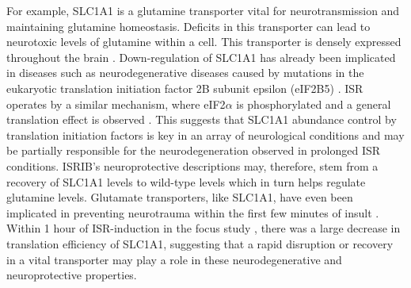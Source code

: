 \documentclass[11pt, a4paper, oneside]{article}
\begin{document}
For example, SLC1A1 is a glutamine transporter vital for neurotransmission and maintaining glutamine homeostasis. Deficits in this transporter can lead to neurotoxic levels of glutamine within a cell. This transporter is densely expressed throughout the brain \cite{slc1a1_neurotoxic}. Down-regulation of SLC1A1 has already been implicated in diseases such as neurodegenerative diseases caused by mutations in the eukaryotic translation initiation factor 2B subunit epsilon (eIF2B5) \cite{eif2b_neuroprotective}. ISR operates by a similar mechanism, where eIF2$\alpha$ is phosphorylated and a general translation effect is observed \cite{isrib_riboseq, isrib_structure}. This suggests that SLC1A1 abundance control by translation initiation factors is key in an array of neurological conditions and may be partially responsible for the neurodegeneration observed in prolonged ISR conditions. ISRIB's neuroprotective descriptions may, therefore, stem from a recovery of SLC1A1 levels to wild-type levels which in turn helps regulate glutamine levels. Glutamate transporters, like SLC1A1, have even been implicated in preventing neurotrauma within the first few minutes of insult \cite{slc1a1_neurotoxic}. Within 1 hour of ISR-induction in the focus study \cite{isrib_riboseq}, there was a large decrease in translation efficiency of SLC1A1, suggesting that a rapid disruption or recovery in a vital transporter may play a role in these neurodegenerative and neuroprotective properties.
\end{document}
